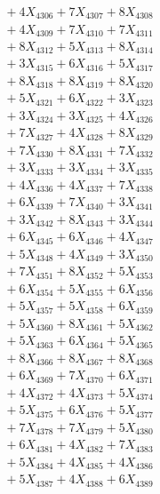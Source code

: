 \documentclass[a4paper,10pt]{article}
\begin{document}
{\begin{align}
&\;  + 4 X_{4306} + 7 X_{4307} + 8 X_{4308} \\[0.3ex]
&\;  + 4 X_{4309} + 7 X_{4310} + 7 X_{4311} \\[0.3ex]
&\;  + 8 X_{4312} + 5 X_{4313} + 8 X_{4314} \\[0.3ex]
&\;  + 3 X_{4315} + 6 X_{4316} + 5 X_{4317} \\[0.3ex]
&\;  + 8 X_{4318} + 8 X_{4319} + 8 X_{4320} \\[0.3ex]
&\;  + 5 X_{4321} + 6 X_{4322} + 3 X_{4323} \\[0.3ex]
&\;  + 3 X_{4324} + 3 X_{4325} + 4 X_{4326} \\[0.3ex]
&\;  + 7 X_{4327} + 4 X_{4328} + 8 X_{4329} \\[0.5ex]\allowbreak
&\;  + 7 X_{4330} + 8 X_{4331} + 7 X_{4332} \\[0.3ex]
&\;  + 3 X_{4333} + 3 X_{4334} + 3 X_{4335} \\[0.3ex]
&\;  + 4 X_{4336} + 4 X_{4337} + 7 X_{4338} \\[0.3ex]
&\;  + 6 X_{4339} + 7 X_{4340} + 3 X_{4341} \\[0.3ex]
&\;  + 3 X_{4342} + 8 X_{4343} + 3 X_{4344} \\[0.3ex]
&\;  + 6 X_{4345} + 6 X_{4346} + 4 X_{4347} \\[0.3ex]
&\;  + 5 X_{4348} + 4 X_{4349} + 3 X_{4350} \\[0.3ex]
&\;  + 7 X_{4351} + 8 X_{4352} + 5 X_{4353} \\[0.3ex]
&\;  + 6 X_{4354} + 5 X_{4355} + 6 X_{4356} \\[0.3ex]
&\;  + 5 X_{4357} + 5 X_{4358} + 6 X_{4359} \\[0.5ex]\allowbreak
&\;  + 5 X_{4360} + 8 X_{4361} + 5 X_{4362} \\[0.3ex]
&\;  + 5 X_{4363} + 6 X_{4364} + 5 X_{4365} \\[0.3ex]
&\;  + 8 X_{4366} + 8 X_{4367} + 8 X_{4368} \\[0.3ex]
&\;  + 6 X_{4369} + 7 X_{4370} + 6 X_{4371} \\[0.3ex]
&\;  + 4 X_{4372} + 4 X_{4373} + 5 X_{4374} \\[0.3ex]
&\;  + 5 X_{4375} + 6 X_{4376} + 5 X_{4377} \\[0.3ex]
&\;  + 7 X_{4378} + 7 X_{4379} + 5 X_{4380} \\[0.3ex]
&\;  + 6 X_{4381} + 4 X_{4382} + 7 X_{4383} \\[0.3ex]
&\;  + 5 X_{4384} + 4 X_{4385} + 4 X_{4386} \\[0.3ex]
&\;  + 5 X_{4387} + 4 X_{4388} + 6 X_{4389} \\[0.5ex]\allowbreak

\end{align}}
\end{document}
